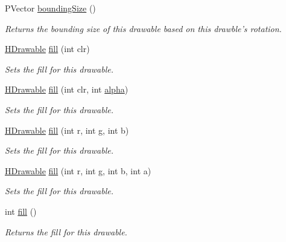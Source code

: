 \begin{DoxyCompactItemize}
\item 
P\-Vector \hyperlink{classhype_1_1core_1_1drawable_1_1_h_drawable_a0441f8e79c68e194dac8a67002d58442}{bounding\-Size} ()
\begin{DoxyCompactList}\small\item\em Returns the bounding size of this drawable based on this drawble's rotation. \end{DoxyCompactList}\item 
\hyperlink{classhype_1_1core_1_1drawable_1_1_h_drawable}{H\-Drawable} \hyperlink{classhype_1_1core_1_1drawable_1_1_h_drawable_aeaea8f98b9ff946de11810a6bf43b052}{fill} (int clr)
\begin{DoxyCompactList}\small\item\em Sets the fill for this drawable. \end{DoxyCompactList}\item 
\hyperlink{classhype_1_1core_1_1drawable_1_1_h_drawable}{H\-Drawable} \hyperlink{classhype_1_1core_1_1drawable_1_1_h_drawable_a6ab630962896a064bb7001972c1b9c03}{fill} (int clr, int \hyperlink{classhype_1_1core_1_1drawable_1_1_h_drawable_ae0711e3bde7279c84b0282f928bbe699}{alpha})
\begin{DoxyCompactList}\small\item\em Sets the fill for this drawable. \end{DoxyCompactList}\item 
\hyperlink{classhype_1_1core_1_1drawable_1_1_h_drawable}{H\-Drawable} \hyperlink{classhype_1_1core_1_1drawable_1_1_h_drawable_a869e813cfe373cd52b3eb79a27a0f6b7}{fill} (int r, int g, int b)
\begin{DoxyCompactList}\small\item\em Sets the fill for this drawable. \end{DoxyCompactList}\item 
\hyperlink{classhype_1_1core_1_1drawable_1_1_h_drawable}{H\-Drawable} \hyperlink{classhype_1_1core_1_1drawable_1_1_h_drawable_a5b76e82c424bffa2f7d37d8551d44bec}{fill} (int r, int g, int b, int a)
\begin{DoxyCompactList}\small\item\em Sets the fill for this drawable. \end{DoxyCompactList}\item 
int \hyperlink{classhype_1_1core_1_1drawable_1_1_h_drawable_a3ea1f5a07f50a01c5210a059056758a7}{fill} ()
\begin{DoxyCompactList}\small\item\em Returns the fill for this drawable. \end{DoxyCompactList}\item 

\end{DoxyCompactItemize}
